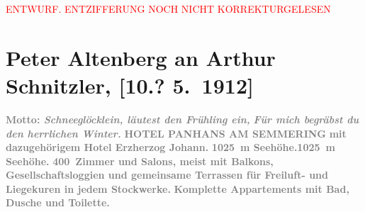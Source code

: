 
\begin{center}
            \textcolor{red}{ENTWURF. ENTZIFFERUNG NOCH NICHT KORREKTURGELESEN}
                      \end{center}
            
               \section[Peter Altenberg an Arthur Schnitzler, {[}10.? 5. 1912{]}]{ Peter Altenberg an Arthur Schnitzler, {[}10.? 5. 1912{]}}\nopagebreak{}\rehead{ }\begin{ledgroupsized}[t]{13cm}\normalsize\beginnumbering{} \toendnotes[C]{\smallbreak\pagebreak[2]} 
\toendnotes[C]{\smallbreak}\pstart
           \noindent{}\raggedleft{}{\pb}\textcolor{gray}{\textbf{Motto: \emph{Schneeglöcklein, läutest den
                            Frühling ein,}}}\pend
           \pstart
           \noindent{}\raggedleft{}\textcolor{gray}{\textbf{\emph{Für mich begräbst du den herrlichen Winter.}}}\pend
           \pstart
           \noindent{}\centering{}\textcolor{gray}{\textbf{HOTEL PANHANS AM SEMMERING}}\pend
           \pstart
           \noindent{}\centering{}\textcolor{gray}{\textbf{mit dazugehörigem Hotel
                            Erzherzog Johann.}}\pend
           \pstart
           \noindent{}\textcolor{gray}{\textbf{1025 m Seehöhe.}}\hfill \textcolor{gray}{\textbf{1025 m Seehöhe.}}\pend
           \pstart
           \centering{}\textcolor{gray}{\textbf{400 Zimmer und Salons, meist mit Balkons,
                        Gesellschaftsloggien und gemeinsame Terrassen für Freiluft- und Liegekuren
                        in jedem Stockwerke.}}\pend
           \pstart
           \noindent{}\centering{}\textcolor{gray}{\textbf{Komplette Appartements mit Bad, Dusche und Toilette.
}}
\end{ledgroupsized}

